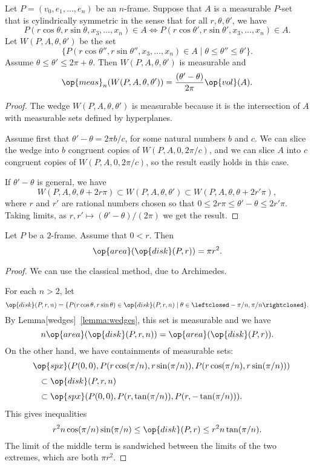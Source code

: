 \begin{lemma}[wedges]\label{lemma:wedges}  Let $P=(v_0,e_1,\ldots,e_n)$ be an $n$-frame.
Suppose that $A$ is a measurable $P$-set that is cylindrically
symmetric in the sense that for all $r,\theta,\theta'$, we have
    $$P(r\cos\theta,r\sin\theta,x_3,\ldots,x_n)\in A
    \Leftrightarrow
    P(r\cos\theta',r\sin\theta',x_3,\ldots,x_n)\in A.$$
Let $W(P,A,\theta,\theta')$ be the set
    $$\{P(r\cos\theta'',r\sin\theta'',x_3,\ldots,x_n)\in
    A\mid \theta\le\theta''\le\theta'\}.$$
Assume $\theta\le\theta'\le 2\pi+\theta$. Then
$W(P,A,\theta,\theta')$ is measurable and
    $$\op{meas}_n(W(P,A,\theta,\theta'))=
    \frac{(\theta'-\theta)}{2\pi}\op{vol}(A).$$
\end{lemma}

\begin{proof}  The wedge $W(P,A,\theta,\theta')$ is measurable because it
is the intersection of $A$ with measurable sets defined by
hyperplanes.

Assume first that  $\theta'-\theta = 2\pi b/c$, for some natural
numbers $b$ and $c$.  We can slice the wedge into $b$ congruent
copies of $W(P,A,0,2\pi/c)$, and we can slice $A$ into $c$ congruent
copies of $W(P,A,0,2\pi/c)$, so the result easily holds in this
case.

If $\theta'-\theta$ is general, we have
    $$W(P,A,\theta,\theta + 2 r \pi)\subset W(P,A,\theta,\theta')
    \subset W(P,A,\theta,\theta + 2 r'\pi),$$
where $r$ and $r'$ are rational numbers chosen so that
    $0\le 2 r \pi \le \theta'-\theta \le 2 r'\pi$.
Taking limits, as $r,r'\mapsto (\theta'-\theta)/(2\pi)$ we get the
result.
\end{proof}

\begin{lemma} Let $P$ be a $2$-frame.
Assume that $0 < r$. Then
    $$\op{area}(\op{disk}(P,r)) = \pi r^2.$$
\end{lemma}

\begin{proof} We can use the classical method, due to Archimedes.

For each $n>2$, let
    $$\op{disk}(P,r,n)= \{P(r\cos\theta,r\sin\theta)\in \op{disk}(P,r,n)\mid
        \theta\in\leftclosed-\pi/n,\pi/n\rightclosed\}.$$
By Lemma[wedges]~\ref{lemma:wedges}, this set is measurable and we
have
    $$n\op{area}(\op{disk}(P,r,n)) = \op{area}(\op{disk}(P,r)).$$
On the other hand, we have containments of measurable sets:
    $$
    \begin{array}{lll}
    &\op{spx}(P(0,0),P(r\cos(\pi/n),r\sin(\pi/n)),P(r\cos(\pi/n),r\sin(\pi/n)))
    \vspace{6pt}\\
    &\quad\subset \op{disk}(P,r,n)
    \vspace{6pt}\\
    &\quad\subset \op{spx}(P(0,0),P(r,\tan(\pi/n)),P(r,-\tan(\pi/n))).
    \end{array}
    $$
This gives inequalities
    $$
    r^2 n \cos(\pi/n)\sin(\pi/n)\le \op{disk}(P,r) \le r^2 n\tan(\pi/n).
    $$
The limit of the middle term is sandwiched between the limits of the
two extremes, which are both $\pi r^2$.
\end{proof}




